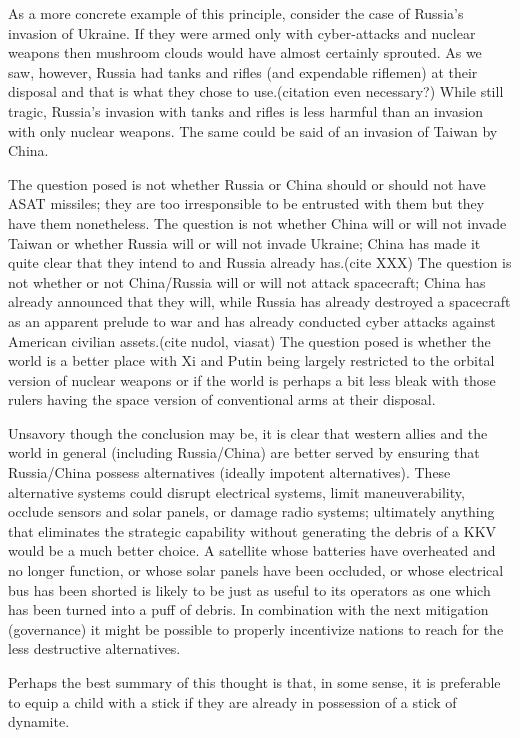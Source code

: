 As a more concrete example of this principle, consider the case of
Russia's invasion of Ukraine.  If they were armed only with
cyber-attacks and nuclear weapons then mushroom clouds would have
almost certainly sprouted.  As we saw, however, Russia had tanks and
rifles (and expendable riflemen) at their disposal and that is what
they chose to use.(citation even necessary?)  While still tragic,
Russia's invasion with tanks and rifles is less harmful than an
invasion with only nuclear weapons.  The same could be said of an
invasion of Taiwan by China.

The question posed is not whether Russia or China should or should not
have ASAT missiles; they are too irresponsible to be entrusted with
them but they have them nonetheless.  The question is not whether
China will or will not invade Taiwan or whether Russia will or will
not invade Ukraine; China has made it quite clear that they intend to
and Russia already has.(cite XXX) The question is not whether or not
China/Russia will or will not attack spacecraft; China has already
announced that they will, while Russia has already destroyed a
spacecraft as an apparent prelude to war and has already conducted
cyber attacks against American civilian assets.(cite nudol, viasat)
The question posed is whether the world is a better place with Xi and
Putin being largely restricted to the orbital version of nuclear
weapons or if the world is perhaps a bit less bleak with those rulers
having the space version of conventional arms at their disposal.

Unsavory though the conclusion may be, it is clear that western allies
and the world in general (including Russia/China) are better served by
ensuring that Russia/China possess alternatives (ideally impotent
alternatives).  These alternative systems could disrupt electrical
systems, limit maneuverability, occlude sensors and solar panels, or
damage radio systems; ultimately anything that eliminates the
strategic capability without generating the debris of a KKV would be a
much better choice.  A satellite whose batteries have overheated and
no longer function, or whose solar panels have been occluded, or whose
electrical bus has been shorted is likely to be just as useful to its
operators as one which has been turned into a puff of debris.  In
combination with the next mitigation (governance) it might be possible
to properly incentivize nations to reach for the less destructive
alternatives.

Perhaps the best summary of this thought is that, in some sense, it is
preferable to equip a child with a stick if they are already in
possession of a stick of dynamite.

